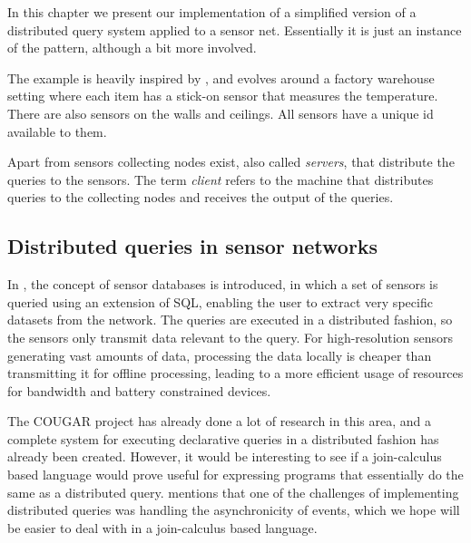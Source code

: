 
\begin{comment}
Disposition:
------------
*Present usecase, its purpose, inspiration.
*Introduce scenario.
  - Assumptions of underlying system.
  - number of msc etc.
*Show overview pseudo-code and describe implementation.
*Discuss generalisability of the program.
  - Argue that more general server-sensor queries may be constructed,
  - And that more general ad-hoc registration is possible.
\end{comment}

In this chapter we present our implementation of a simplified version of a
distributed query system applied to a sensor net. Essentially it is just an
instance of the  pattern, although a bit more involved.

The example is heavily inspired by \cite{bonnet2001towards}, and
evolves around a factory warehouse setting where each item has a
stick-on sensor that measures the temperature. There are also
sensors on the walls and ceilings. All sensors have a unique id available to them.

Apart from sensors collecting nodes exist, also called \emph{servers}, that
distribute the queries to the sensors. The term \emph{client} refers to the machine
that distributes queries to the collecting nodes and receives the output of the queries.

\subsection*{Distributed queries in sensor networks}

In \cite{bonnet2001towards}, the concept of sensor databases is
introduced, in which a set of sensors is queried using an extension of
SQL, enabling the user to extract very specific datasets from the
network. The queries are executed in a distributed fashion, so the
sensors only transmit data relevant to the query.  For high-resolution
sensors generating vast amounts of data, processing the data locally
is cheaper than transmitting it for offline processing, leading to a
more efficient usage of resources for bandwidth and battery
constrained devices.

The COUGAR project\cite{COUGAR} has already done a lot of research in this
area, and a complete system for executing declarative queries in a distributed
fashion has already been created. However, it would be interesting to see if a
join-calculus based language would prove useful for expressing programs that
essentially do the same as a distributed query. \cite{bonnet2001towards}
mentions that one of the challenges of implementing distributed queries was
handling the asynchronicity of events, which we hope will be easier to deal
with in a join-calculus based language.

